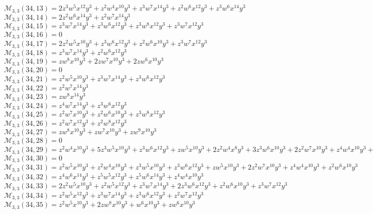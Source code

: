 \documentclass[12pt]{memoireuqam1.3}
\begin{document}
$\mathcal{M}_{3,3}(34,13)=2z^3w^5x^{12}y^3+z^2w^4x^{10}y^3+z^3w^7x^{14}y^3+z^2w^6x^{12}y^3+z^3w^6x^{14}y^3$\\
$\mathcal{M}_{3,3}(34,14)=2z^2w^6x^{14}y^3+z^2w^7x^{14}y^3$\\
$\mathcal{M}_{3,3}(34,15)=z^3w^7x^{14}y^3+z^3w^6x^{12}y^3+z^3w^8x^{12}y^3+z^3w^7x^{12}y^3$\\
$\mathcal{M}_{3,3}(34,16)=0$\\
$\mathcal{M}_{3,3}(34,17)=2z^2w^5x^{10}y^3+z^3w^6x^{12}y^3+z^2w^6x^{10}y^3+z^3w^7x^{12}y^3$\\
$\mathcal{M}_{3,3}(34,18)=z^3w^7x^{14}y^3+z^2w^6x^{12}y^3$\\
$\mathcal{M}_{3,3}(34,19)=zw^8x^{10}y^3+2zw^7x^{10}y^3+2zw^6x^{10}y^3$\\
$\mathcal{M}_{3,3}(34,20)=0$\\
$\mathcal{M}_{3,3}(34,21)=z^2w^5x^{10}y^3+z^3w^7x^{14}y^3+z^3w^6x^{12}y^3$\\
$\mathcal{M}_{3,3}(34,22)=z^2w^7x^{14}y^3$\\
$\mathcal{M}_{3,3}(34,23)=zw^8x^{14}y^3$\\
$\mathcal{M}_{3,3}(34,24)=z^4w^7x^{14}y^3+z^3w^6x^{12}y^3$\\
$\mathcal{M}_{3,3}(34,25)=z^2w^7x^{10}y^3+z^2w^6x^{10}y^3+z^3w^8x^{12}y^3$\\
$\mathcal{M}_{3,3}(34,26)=z^2w^7x^{12}y^3+z^2w^8x^{12}y^3$\\
$\mathcal{M}_{3,3}(34,27)=zw^8x^{10}y^3+zw^7x^{10}y^3+zw^9x^{10}y^3$\\
$\mathcal{M}_{3,3}(34,28)=0$\\
$\mathcal{M}_{3,3}(34,29)=z^2w^4x^{10}y^3+5z^3w^5x^{10}y^3+z^3w^6x^{12}y^3+zw^5x^{10}y^3+2z^2w^4x^8y^3+3z^3w^6x^{10}y^3+2z^2w^7x^{10}y^3+z^4w^4x^{10}y^3+z^2w^5x^8y^3$\\
$\mathcal{M}_{3,3}(34,30)=0$\\
$\mathcal{M}_{3,3}(34,31)=z^2w^5x^{10}y^3+z^2w^4x^{10}y^3+z^3w^5x^{10}y^3+z^3w^6x^{12}y^3+zw^5x^{10}y^3+2z^2w^7x^{10}y^3+z^4w^4x^{10}y^3+z^2w^6x^{10}y^3$\\
$\mathcal{M}_{3,3}(34,32)=z^4w^6x^{14}y^3+z^5w^5x^{12}y^3+z^5w^6x^{14}y^3+z^4w^4x^{10}y^3$\\
$\mathcal{M}_{3,3}(34,33)=2z^2w^5x^{10}y^3+z^2w^5x^{12}y^3+z^3w^7x^{14}y^3+2z^3w^6x^{12}y^3+z^2w^6x^{10}y^3+z^3w^7x^{12}y^3$\\
$\mathcal{M}_{3,3}(34,34)=z^2w^5x^{12}y^3+z^3w^7x^{14}y^3+z^3w^6x^{12}y^3+z^2w^7x^{12}y^3$\\
$\mathcal{M}_{3,3}(34,35)=z^2w^5x^{10}y^3+2zw^8x^{10}y^3+w^6x^{10}y^3+zw^6x^{10}y^3$\\
\end{document}
